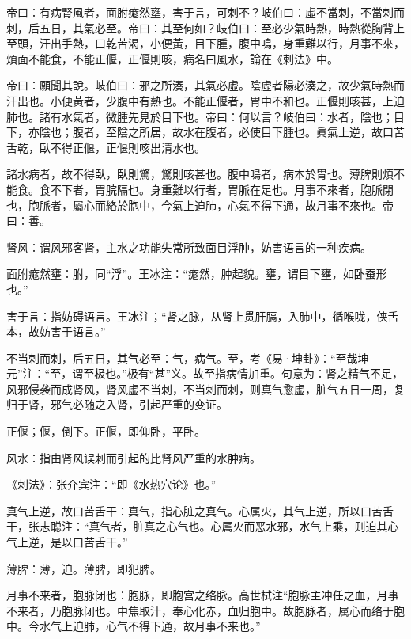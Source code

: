 \documentclass[draft,12pt]{ctexbook}
\begin{document}

\begin{yuanwen}
帝曰：有病腎風者，面胕痝然壅，害于言，可刺不？岐伯曰：虛不當刺，不當刺而刺，后五日，其氣必至。帝曰：其至何如？岐伯曰：至必少氣時熱，時熱從胸背上至頭，汗出手熱，口乾苦渴，小便黃，目下腫，腹中鳴，身重難以行，月事不來，煩面不能食，不能正偃，正偃則咳，病名曰風水，論在《刺法》中。

帝曰：願聞其說。岐伯曰：邪之所湊，其氣必虛。陰虛者陽必湊之，故少氣時熱而汗出也。小便黃者，少腹中有熱也。不能正偃者，胃中不和也。正偃則咳甚，上迫肺也。諸有水氣者，微腫先見於目下也。帝曰：何以言？岐伯曰：水者，陰也；目下，亦陰也；腹者，至陰之所居，故水在腹者，必使目下腫也。眞氣上逆，故口苦舌乾，臥不得正偃，正偃則咳出清水也。

諸水病者，故不得臥，臥則驚，驚則咳甚也。腹中鳴者，病本於胃也。薄脾則煩不能食。食不下者，胃脘隔也。身重難以行者，胃脈在足也。月事不來者，胞脈閉也，胞脈者，屬心而絡於胞中，今氣上迫肺，心氣不得下通，故月事不來也。帝曰：善。
\end{yuanwen}


\begin{jiaozhu}
	\item 肾风：谓风邪客肾，主水之功能失常所致面目浮肿，妨害语言的一种疾病。
	\item 面胕痝然壅：胕，同“浮”。王冰注：“痝然，肿起貌。壅，谓目下壅，如卧蚕形也。”
	\item 害于言：指妨碍语言。王冰注；“肾之脉，从肾上贯肝膈，入肺中，循喉咙，侠舌本，故妨害于语言。”
	\item 不当刺而刺，后五日，其气必至：气，病气。至，考《易·坤卦》：“至哉坤元”注：“至，谓至极也。”极有“甚”义。故至指病情加重。句意为：肾之精气不足，风邪侵袭而成肾风，肾风虚不当刺，不当刺而刺，则真气愈虚，脏气五日一周，复归于肾，邪气必随之入肾，引起严重的变证。
	\item 正偃；偃，倒下。正偃，即仰卧，平卧。
	\item 风水：指由肾风误刺而引起的比肾风严重的水肿病。
	\item 《刺法》：张介宾注：“即《水热穴论》也。”
	\item 真气上逆，故口苦舌干：真气，指心脏之真气。心属火，其气上逆，所以口苦舌干，张志聪注：“真气者，脏真之心气也。心属火而恶水邪，水气上乘，则迫其心气上逆，是以口苦舌干。”
	\item 薄脾：薄，迫。薄脾，即犯脾。
	\item 月事不来者，胞脉闭也：胞脉，即胞宫之络脉。高世栻注“胞脉主冲任之血，月事不来者，乃胞脉闭也。中焦取汁，奉心化赤，血归胞中。故胞脉者，属心而络于胞中。今水气上迫肺，心气不得下通，故月事不来也。”
\end{jiaozhu}
\end{document}
